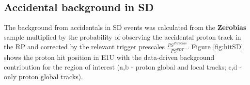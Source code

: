 \subsection{Accidental background in SD}
The background from accidentals in SD events was calculated from the \textbf{Zerobias} sample multiplied by the probability of observing the accidental proton track in the RP and corrected by the relevant trigger prescales $\frac{PS^{Zerobias}}{PS^{SDT}}$. Figure \ref{fig:hitSD} shows the proton hit position in E1U with the data-driven background contribution for the region of interest (a,b - proton global and local tracks; c,d - only proton global tracks). 
\begin{figure}[H]
	\centering
	\parbox{0.48\textwidth}{
		\centering
		\begin{subfigure}[b]{\linewidth}{
				}
		\end{subfigure}
	}
	\quad
	\parbox{0.48\textwidth}{
		\centering
		\begin{subfigure}[b]{\linewidth}{
				}

\end{subfigure}}
\end{figure}
